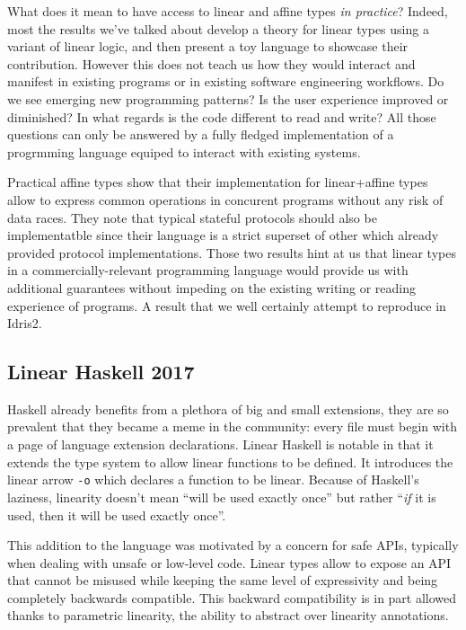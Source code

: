 \documentclass[
]{article}
\begin{document}
What does it mean to have access to linear and affine types \emph{in
practice}? Indeed, most the results we've talked about develop a theory
for linear types using a variant of linear logic, and then present a toy
language to showcase their contribution. However this does not teach us
how they would interact and manifest in existing programs or in existing
software engineering workflows. Do we see emerging new programming
patterns? Is the user experience improved or diminished? In what regards
is the code different to read and write? All those questions can only be
answered by a fully fledged implementation of a progrmming language
equiped to interact with existing systems.

Practical affine types show that their implementation for linear+affine
types allow to express common operations in concurent programs without
any risk of data races. They note that typical stateful protocols should
also be implementatble since their language is a strict superset of
other which already provided protocol implementations. Those two results
hint at us that linear types in a commercially-relevant programming
language would provide us with additional guarantees without impeding on
the existing writing or reading experience of programs. A result that we
well certainly attempt to reproduce in Idris2.

\hypertarget{linear-haskell-2017}{%
\subsection{Linear Haskell 2017}\label{linear-haskell-2017}}

Haskell already benefits from a plethora of big and small extensions,
they are so prevalent that they became a meme in the community: every
file must begin with a page of language extension declarations. Linear
Haskell is notable in that it extends the type system to allow linear
functions to be defined. It introduces the linear arrow \texttt{-o}
which declares a function to be linear. Because of Haskell's laziness,
linearity doesn't mean ``will be used exactly once'' but rather
``\emph{if} it is used, then it will be used exactly once''.

This addition to the language was motivated by a concern for safe APIs,
typically when dealing with unsafe or low-level code. Linear types allow
to expose an API that cannot be misused while keeping the same level of
expressivity and being completely backwards compatible. This backward
compatibility is in part allowed thanks to parametric linearity, the
ability to abstract over linearity annotations.
\end{document}
